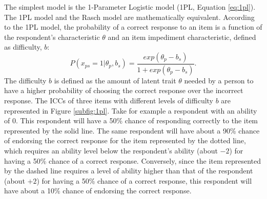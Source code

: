 \documentclass[12pt]{book}
\begin{document}
The simplest model is the 1-Parameter Logistic model (1PL, Equation \ref{eq:1pl}). 
The 1PL model and the Rasch model \cite{rasch1960} are mathematically equivalent. According to the 1PL model, the probability of a correct response to an item is a function of the respondent's characteristic $\theta$ and an item impediment characteristic, defined as difficulty, $b$: 
\begin{equation}\label{eq:1pl}
	P(x_{ps} = 1 | \theta_p, b_s) = \frac{exp(\theta_p - b_s)}{1 + exp(\theta_p - b_s)}.
\end{equation}
The difficulty $b$ is defined as the amount of latent trait  $\theta$ needed by a person to have a higher probability of choosing the correct response over the incorrect response. 
The ICCs of three items with different levels of difficulty $b$ are represented in Figure \ref{subfig:1pl}. 
	Take for example a respondent with an ability of 0. This respondent will have a  50\% chance of responding correctly to the item represented by the solid line. The same respondent will have about a 90\% chance of endorsing the correct response for the item represented by the dotted line, which requires an ability level below the respondent's ability (about $-2$)  for having a 50\% chance of a correct response. 
Conversely, since the item represented by the dashed line requires a level of ability higher than that of the respondent (about $+2$) for having a 50\% chance of a correct response, this respondent will have about a 10\% chance of endorsing the correct response. 
\end{document}
